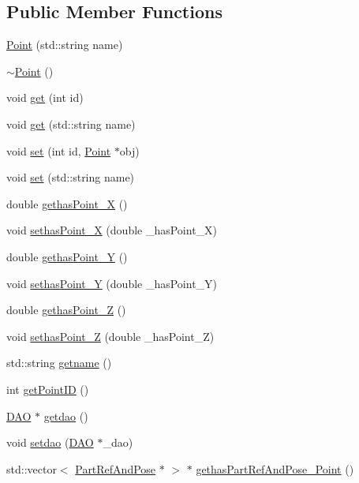 \subsection*{Public Member Functions}
\begin{DoxyCompactItemize}
\item 
\hyperlink{class_point_a63882979decdb98b43ff15b251d34e2b}{Point} (std::string name)
\item 
\hyperlink{class_point_a395fa04b4ec126b66fc053f829a30cc1}{$\sim$Point} ()
\item 
void \hyperlink{class_point_a6fea183c8c7514ff6657d1bb43b785cb}{get} (int id)
\item 
void \hyperlink{class_point_a2429613b245de5c3eb064b7e33850495}{get} (std::string name)
\item 
void \hyperlink{class_point_aded7566a3e7d79333e306fb4f20773c0}{set} (int id, \hyperlink{class_point}{Point} $\ast$obj)
\item 
void \hyperlink{class_point_a4a2013c10fb10b5c62c7b4c6fba14dfe}{set} (std::string name)
\item 
double \hyperlink{class_point_a382dc05520c2c07ad4348c0cd393d67c}{gethasPoint\_\-X} ()
\item 
void \hyperlink{class_point_a3f84ca6d3a5066ff77294a9b0edb65fb}{sethasPoint\_\-X} (double \_\-hasPoint\_\-X)
\item 
double \hyperlink{class_point_a729a84340d573bc1b04d6b70b59390a3}{gethasPoint\_\-Y} ()
\item 
void \hyperlink{class_point_a999c28ad63206d93d7619ae5bb895fef}{sethasPoint\_\-Y} (double \_\-hasPoint\_\-Y)
\item 
double \hyperlink{class_point_affdfded17dc9786a8bc8e196b86940b2}{gethasPoint\_\-Z} ()
\item 
void \hyperlink{class_point_aaa5adbbe9fe7dda6d3ef1a312c6e5f57}{sethasPoint\_\-Z} (double \_\-hasPoint\_\-Z)
\item 
std::string \hyperlink{class_point_afc547192531382caf91fadf15d9b9422}{getname} ()
\item 
int \hyperlink{class_point_a5cc51865e0a475e948906da603bc1957}{getPointID} ()
\item 
\hyperlink{class_d_a_o}{DAO} $\ast$ \hyperlink{class_point_a388f755bac4026d6d24ceb3d49117707}{getdao} ()
\item 
void \hyperlink{class_point_a505b2c2e820cf9ef9dfdc66738a8c151}{setdao} (\hyperlink{class_d_a_o}{DAO} $\ast$\_\-dao)
\item 
std::vector$<$ \hyperlink{class_part_ref_and_pose}{PartRefAndPose} $\ast$ $>$ $\ast$ \hyperlink{class_point_a144e4bd73ed78d4c60f46476df2945f0}{gethasPartRefAndPose\_\-Point} ()

\end{DoxyCompactItemize}
